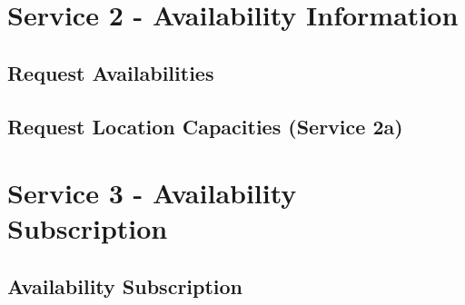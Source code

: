 \section{Service 2 - Availability Information}
\label{sec:Nachrichten:Dienst2}

\subsection*{Request Availabilities}
\label{subsec:Nachrichten:Dienst2:Availability}



\medskip



\medskip


\subsection*{Request Location Capacities (Service 2a)}
\label{subsec:Nachrichten:Dienst2:PlaceAvailability}





\section{Service 3 - Availability Subscription}
\label{sec:Nachrichten:Dienst3}

\subsection*{Availability Subscription}
\label{subsec:Nachrichten:Dienst3:AvailabilitySubscription}



\medskip



% 

% 




